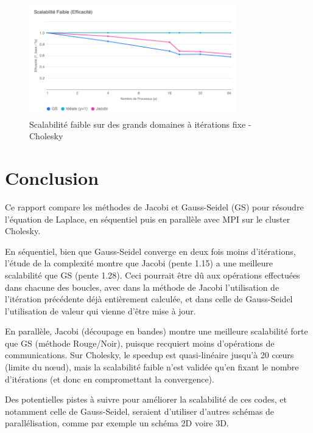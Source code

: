 \documentclass{article}
\begin{document}
\begin{figure}[H]
    \centering
    \includegraphics[width=0.8\textwidth]{Scalabilité_Faible_Efficacité_It}
    \caption{Scalabilité faible sur des grands domaines à itérations fixe - Cholesky}
    \label{fig:weakCholeskyBigIt}
\end{figure}

\section*{Conclusion}

Ce rapport compare les méthodes de Jacobi et Gauss-Seidel (GS) pour résoudre l'équation de Laplace, en séquentiel puis en parallèle avec MPI sur le cluster Cholesky.

En séquentiel, bien que Gauss-Seidel converge en deux fois moins d'itérations, l'étude de la complexité montre que Jacobi (pente 1.15) a une meilleure scalabilité que GS (pente 1.28). Ceci pourrait être dû aux opérations effectuées dans chacune des boucles, avec dans la méthode de Jacobi l'utilisation de l'itération précédente déjà entièrement calculée, et dans celle de Gauss-Seidel l'utilisation de valeur qui vienne d'être mise à jour.

En parallèle, Jacobi (découpage en bandes) montre une meilleure scalabilité forte que GS (méthode Rouge/Noir), puisque recquiert moins d'opérations de communications. Sur Cholesky, le speedup est quasi-linéaire jusqu'à 20 cœurs (limite du nœud), mais la scalabilité faible n'est validée qu'en fixant le nombre d'itérations (et donc en compromettant la convergence).

Des potentielles pistes à suivre pour améliorer la scalabilité de ces codes, et notamment celle de Gauss-Seidel, seraient d'utiliser d'autres schémas de parallélisation, comme par exemple un schéma 2D voire 3D.
\end{document}

